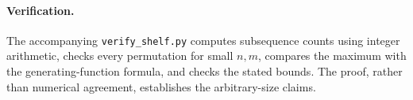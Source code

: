 \documentclass[11pt]{article}
\begin{document}
\paragraph{Verification.}
The accompanying \texttt{verify\_shelf.py} computes subsequence counts using
integer arithmetic, checks every permutation for small $n,m$, compares the
maximum with the generating-function formula, and checks the stated bounds.
The proof, rather than numerical agreement, establishes the arbitrary-size
claims.
\end{document}
